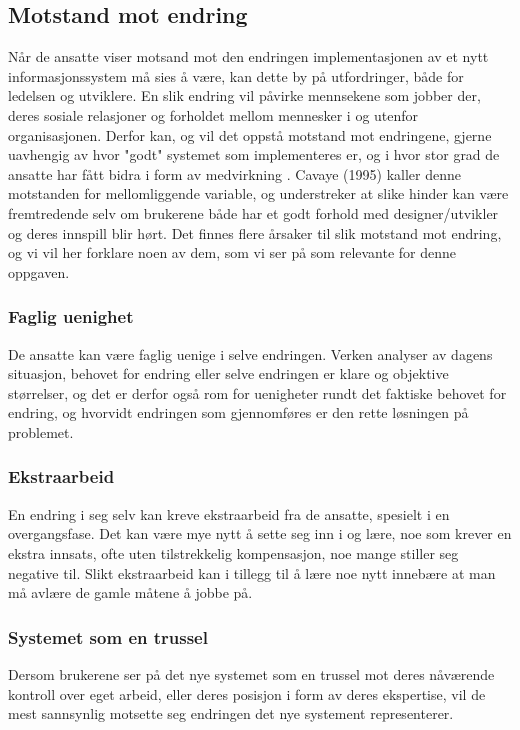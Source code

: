 \subsection{Motstand mot endring}
\label{chp: motstand}

Når de ansatte viser motsand mot den endringen implementasjonen av et nytt informasjonssystem må sies å være, kan dette by på utfordringer, både for ledelsen og utviklere. En slik endring vil påvirke mennsekene som jobber der, deres sosiale relasjoner og forholdet mellom mennesker i og utenfor organisasjonen. Derfor kan, og vil det oppstå motstand mot endringene, gjerne uavhengig av hvor "godt" systemet som implementeres er, og i hvor stor grad de ansatte har fått bidra i form av medvirkning \cite{Jacobsen12}. Cavaye (1995) kaller denne motstanden for mellomliggende variable, og understreker at slike hinder kan være fremtredende selv om brukerene både har et godt forhold med designer/utvikler og deres innspill blir hørt. Det finnes flere årsaker til slik motstand mot endring, og vi vil her forklare noen av dem, som vi ser på som relevante for denne oppgaven. 

\subsubsection{Faglig uenighet}
De ansatte kan være faglig uenige i selve endringen. Verken analyser av dagens situasjon, behovet for endring eller selve endringen er klare og objektive størrelser, og det er derfor også rom for uenigheter rundt det faktiske behovet for endring, og hvorvidt endringen som gjennomføres er den rette løsningen på problemet. \cite{Jacobsen12}

\subsubsection{Ekstraarbeid}
En endring i seg selv kan kreve ekstraarbeid fra de ansatte, spesielt i en overgangsfase. Det kan være mye nytt å sette seg inn i og lære, noe som krever en ekstra innsats, ofte uten tilstrekkelig kompensasjon, noe mange stiller seg negative til. Slikt ekstraarbeid kan i tillegg til å lære noe nytt innebære at man må avlære de gamle måtene å jobbe på. \cite{Jacobsen12}

\subsubsection{Systemet som en trussel}
Dersom brukerene ser på det nye systemet som en trussel mot deres nåværende kontroll over eget arbeid, eller deres posisjon i form av deres ekspertise, vil de mest sannsynlig motsette seg endringen det nye systement representerer. \cite{Cavaye95}

